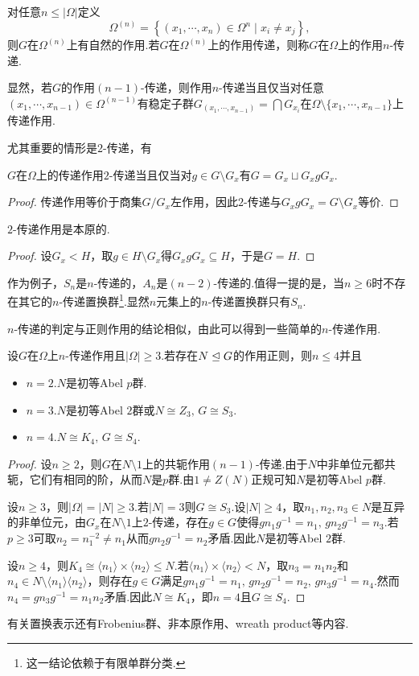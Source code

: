 对任意$n\le|\Omega|$定义
\[
	\Omega^{(n)}=\left\{(x_1,\cdots,x_n)\in\Omega^n\mid x_i\ne x_j\right\},
\]
则$G$在$\Omega^{(n)}$上有自然的作用.若$G$在$\Omega^{(n)}$上的作用传递，则称$G$在$\Omega$上的作用$n$-{\heiti 传递}.

显然，若$G$的作用$(n-1)$-传递，则作用$n$-传递当且仅当对任意$(x_1,\cdots,x_{n-1})\in\Omega^{(n-1)}$有稳定子群$G_{(x_1,\cdots,x_{n-1})}=\bigcap G_{x_i}$在$\Omega\setminus\{x_1,\cdots,x_{n-1}\}$上传递作用.

尤其重要的情形是$2$-传递，有
\begin{lemma*}
	$G$在$\Omega$上的传递作用$2$-传递当且仅当对$g\in G\setminus G_x$有$G=G_x\sqcup G_xgG_x$.\footnotemark
\end{lemma*}
\begin{proof}
	传递作用等价于商集$G/G_x$左作用，因此$2$-传递与$G_xgG_x=G\setminus G_x$等价.
\end{proof}
\begin{prop}
	$2$-传递作用是本原的.
\end{prop}
\begin{proof}
	设$G_x<H$，取$g\in H\setminus G_x$得$G_xgG_x\subseteq H$，于是$G=H$.
\end{proof}

作为例子，$S_n$是$n$-传递的，$A_n$是$(n-2)$-传递的.值得一提的是，当$n\ge 6$时不存在其它的$n$-传递置换群\footnote{这一结论依赖于有限单群分类.}.显然$n$元集上的$n$-传递置换群只有$S_n$.

$n$-传递的判定与正则作用的结论相似，由此可以得到一些简单的$n$-传递作用.
\begin{prop}
	设$G$在$\Omega$上$n$-传递作用且$|\Omega|\ge 3$.若存在$N\trianglelefteq G$的作用正则，则$n\le 4$并且
	\begin{itemize}
		\item $n=2$.\quad $N$是初等Abel $p$群.
		\item $n=3$.\quad $N$是初等Abel $2$群或$N\cong Z_3,\,G\cong S_3$.
		\item $n=4$.\quad $N\cong K_4,\,G\cong S_4$.
	\end{itemize}
\end{prop}
\begin{proof}
	设$n\ge 2$，则$G$在$N\setminus 1$上的共轭作用$(n-1)$-传递.由于$N$中非单位元都共轭，它们有相同的阶，从而$N$是$p$群.由$1\ne Z(N)$正规可知$N$是初等Abel $p$群.

	设$n\ge 3$，则$|\Omega|=|N|\ge 3$.若$|N|=3$则$G\cong S_3$.设$|N|\ge 4$，取$n_1,n_2,n_3\in N$是互异的非单位元，由$G_{x}$在$N\setminus 1$上$2$-传递，存在$g\in G$使得$gn_1g^{-1}=n_1,\,gn_2g^{-1}=n_3$.若$p\ge 3$可取$n_2=n_1^{-2}\ne n_1$从而$gn_2g^{-1}=n_2$矛盾.因此$N$是初等Abel $2$群.

	设$n\ge 4$，则$K_4\cong\langle n_1\rangle\times\langle n_2\rangle\le N$.若$\langle n_1\rangle\times\langle n_2\rangle <N$，取$n_3=n_1n_2$和$n_4\in N\setminus\langle n_1\rangle\langle n_2\rangle $，则存在$g\in G$满足$gn_1g^{-1}=n_1,\,gn_2g^{-1}=n_2,\,gn_3g^{-1}=n_4$.然而$n_4=gn_3g^{-1}=n_1n_2$矛盾.因此$N\cong K_4$，即$n=4$且$G\cong S_4$.
\end{proof}
\begin{remark}
	有关置换表示还有Frobenius群、非本原作用、wreath product等内容.
\end{remark}
